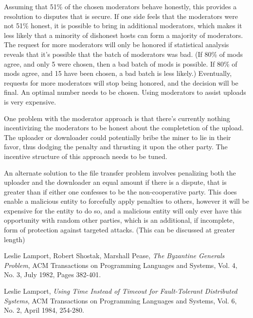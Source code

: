 \documentclass[twocolumn]{article}
\begin{document}
\begin{appendices}
Assuming that 51\% of the chosen moderators behave honestly, this provides a resolution to disputes that is secure.
If one side feels that the moderators were not 51\% honest, it is possible to bring in additional moderators, which makes it less likely that a minority of dishonest hosts can form a majority of moderators.
The request for more moderators will only be honored if statistical analysis reveals that it's possible that the batch of moderators was bad. (If 80\% of mods agree, and only 5 were chosen, then a bad batch of mods is possible. If 80\% of mods agree, and 15 have been chosen, a bad batch is less likely.)
Eventually, requests for more moderators will stop being honored, and the decision will be final.
An optimal number needs to be chosen.
Using moderators to assist uploads is very expensive.

One problem with the moderator approach is that there's currently nothing incentivizing the moderators to be honest about the completetion of the upload.
The uploader or downloader could potentially bribe the miner to lie in their favor, thus dodging the penalty and thrusting it upon the other party.
The incentive structure of this approach needs to be tuned.

An alternate solution to the file transfer problem involves penalizing both the uploader and the downloader an equal amount if there is a dispute, that is greater than if either one confesses to be the non-cooperative party.
This does enable a malicious entity to forcefully apply penalties to others, however it will be expensive for the entity to do so, and a malicious entity will only ever have this opportunity with random other parties, which is an additional, if incomplete, form of protection against targeted attacks.
(This can be discussed at greater length)

\end{appendices}

\begin{thebibliography}{1}

	Leslie Lamport, Robert Shostak, Marshall Pease,
	\emph{The Byzantine Generals Problem},
	ACM Transactions on Programming Languages and Systems, Vol. 4, No. 3, July 1982, Pages 382-401.

	Leslie Lamport,
	\emph{Using Time Instead of Timeout for Fault-Tolerant Distributed Systems},
	ACM Transactions on Programming Languages and Systems, Vol. 6, No. 2, April 1984, 254-280.

\end{thebibliography}
\end{document}
